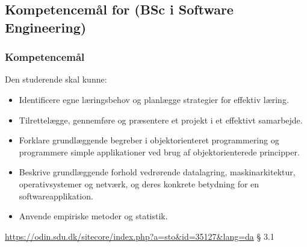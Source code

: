 \documentclass[t, aspectratio=169]{beamer}
\begin{document}
\begin{frame}[fragile]
{
  }
\end{frame}

\subsection{Kompetencemål for (BSc i Software Engineering)}
\begin{frame}[fragile]
  \frametitle{Kompetencemål}
  \vspace{3mm}
  Den studerende skal kunne:
  \begin{itemize}
    \item Identificere egne læringsbehov og planlægge strategier for effektiv læring.
    \item Tilrettelægge, gennemføre og præsentere et projekt i et effektivt samarbejde.
    \item Forklare grundlæggende begreber i objektorienteret programmering og programmere simple applikationer ved brug af objektorienterede principper.
    \item Beskrive grundlæggende forhold vedrørende datalagring, maskinarkitektur, operativsystemer og netværk, og deres konkrete betydning for en softwareapplikation.
    \item Anvende empiriske metoder og statistik.
  \end{itemize}
  
  \vspace{5mm}
  \textcolor{blue}{\url{https://odin.sdu.dk/sitecore/index.php?a=sto&id=35127&lang=da}} § 3.1
\end{frame}
\end{document}
